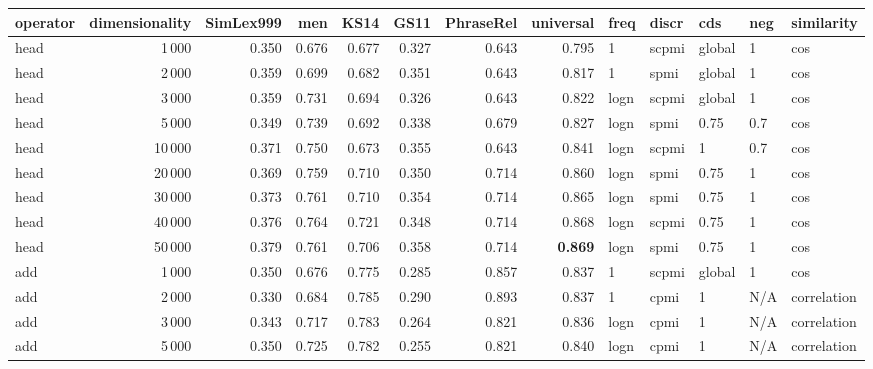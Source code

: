 \begin{tabular}{lrrrrrrrlllll}
\toprule
operator &  dimensionality &  SimLex999 &    men &   KS14 &   GS11 &  PhraseRel &  universal &  freq &  discr &     cds &  neg &     similarity \\
\midrule
    head &            1\,000 &      0.350 &  0.676 &  0.677 &  0.327 &      0.643 &      0.795 &     1 &  scpmi &  global &    1 &            cos \\
    head &            2\,000 &      0.359 &  0.699 &  0.682 &  0.351 &      0.643 &      0.817 &     1 &   spmi &  global &    1 &            cos \\
    head &            3\,000 &      0.359 &  0.731 &  0.694 &  0.326 &      0.643 &      0.822 &  logn &  scpmi &  global &    1 &            cos \\
    head &            5\,000 &      0.349 &  0.739 &  0.692 &  0.338 &      0.679 &      0.827 &  logn &   spmi &    0.75 &  0.7 &            cos \\
    head &           10\,000 &      0.371 &  0.750 &  0.673 &  0.355 &      0.643 &      0.841 &  logn &  scpmi &       1 &  0.7 &            cos \\
    head &           20\,000 &      0.369 &  0.759 &  0.710 &  0.350 &      0.714 &      0.860 &  logn &   spmi &    0.75 &    1 &            cos \\
    head &           30\,000 &      0.373 &  0.761 &  0.710 &  0.354 &      0.714 &      0.865 &  logn &   spmi &    0.75 &    1 &            cos \\
    head &           40\,000 &      0.376 &  0.764 &  0.721 &  0.348 &      0.714 &      0.868 &  logn &  scpmi &    0.75 &    1 &            cos \\
    head &           50\,000 &      0.379 &  0.761 &  0.706 &  0.358 &      0.714 &      \textbf{0.869} &  logn &   spmi &    0.75 &    1 &            cos \\ \addlinespace
     add &            1\,000 &      0.350 &  0.676 &  0.775 &  0.285 &      0.857 &      0.837 &     1 &  scpmi &  global &    1 &            cos \\
     add &            2\,000 &      0.330 &  0.684 &  0.785 &  0.290 &      0.893 &      0.837 &     1 &   cpmi &       1 &  N/A &    correlation \\
     add &            3\,000 &      0.343 &  0.717 &  0.783 &  0.264 &      0.821 &      0.836 &  logn &   cpmi &       1 &  N/A &    correlation \\
     add &            5\,000 &      0.350 &  0.725 &  0.782 &  0.255 &      0.821 &      0.840 &  logn &   cpmi &       1 &  N/A &    correlation \\

\end{tabular}
